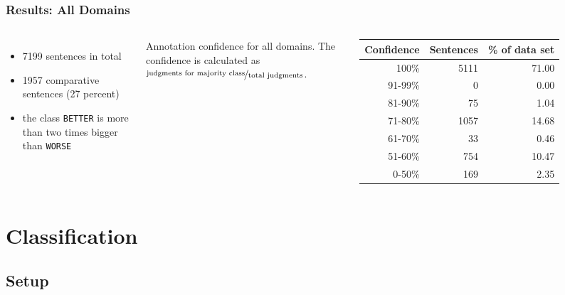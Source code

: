 \documentclass[11pt,aspectratio=169,usenames,dvipsnames]{beamer}
\begin{document}
    \begin{frame}[t]
        \frametitle{Results: All Domains}



        \begin{columns}
            \column{2in}
            \begin{itemize}
                \item 7199 sentences in total
                \item 1957 comparative sentences (27 percent)
                \item the class \texttt{BETTER} is more than two times bigger than \texttt{WORSE}
            \end{itemize}
            \column{3in}
            Annotation confidence for all domains. The confidence is calculated as $\nicefrac{\text{judgments for majority class}}{\text{total judgments}}$.
            \begin{tabular}{@{}rrr@{}}
                \toprule
                Confidence & Sentences & \% of data set \\
                \midrule
                100\%    & 5111 & 71.00     \\
                91-99\%    & 0 & 0.00     \\
                81-90\%    & 75 & 1.04     \\
                71-80\%    & 1057 & 14.68     \\
                61-70\%    & 33 & 0.46     \\
                51-60\%    & 754 & 10.47     \\
                0-50\%    & 169 & 2.35     \\
                \bottomrule
            \end{tabular}

        \end{columns}


    \end{frame}


    \section{Classification}
        \frame{\sectionpage}
    
    \subsection{Setup}
    \frame{\subsectionpage}
\end{document}
